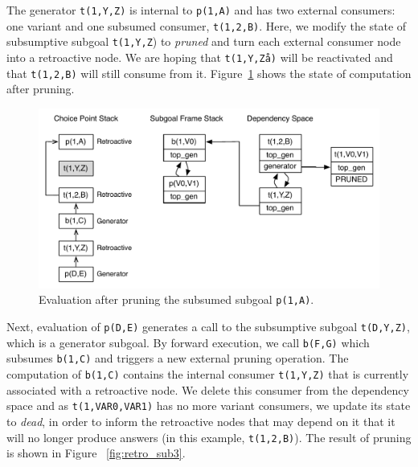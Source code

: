The generator \texttt{t(1,Y,Z)} is internal to \texttt{p(1,A)} and has two external consumers: one variant
and one subsumed consumer, \texttt{t(1,2,B)}. Here, we modify the state of subsumptive subgoal \texttt{t(1,Y,Z})
to \textit{pruned} and turn each external consumer node into a retroactive node. We are hoping that \texttt{t(1,Y,Zå)}
will be reactivated and that \texttt{t(1,2,B)} will still consume from it. Figure~\ref{fig:retro_sub2}
shows the state of computation after pruning.

\begin{figure}[ht]
  \centering
    \includegraphics[scale=0.5]{retro_sub2.pdf}
  \caption{Evaluation after pruning the subsumed subgoal \texttt{p(1,A)}.}
  \label{fig:retro_sub2}
\end{figure}

Next, evaluation of \texttt{p(D,E)} generates a call to the subsumptive subgoal \texttt{t(D,Y,Z)}, which
is a generator subgoal. By forward execution, we call \texttt{b(F,G)} which subsumes \texttt{b(1,C)} and triggers
a new external pruning operation. The computation of \texttt{b(1,C)} contains the internal consumer
\texttt{t(1,Y,Z)} that is currently associated with a retroactive node. We delete this consumer from the
dependency space and as \texttt{t(1,VAR0,VAR1)} has no more variant consumers,
we update its state to \textit{dead}, in order to inform the retroactive nodes that may depend on it that it
will no longer produce answers (in this example, \texttt{t(1,2,B)}). The result of pruning is shown in
Figure ~\ref{fig:retro_sub3}.

